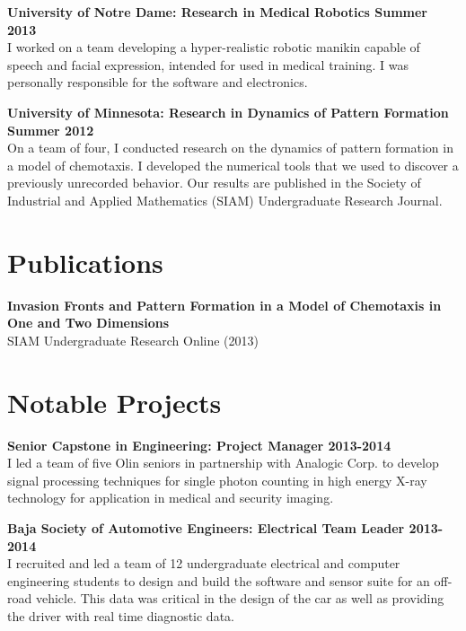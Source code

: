 \documentclass{article}
\newcommand{\newitem}[2]{\noindent\textbf{#1 \hfill #2}\\}
\newcommand{\gimmespace}{\vspace{1em}}
\begin{document}
\newitem{University of Notre Dame: Research in Medical Robotics}{Summer 2013}
I worked on a team developing a hyper-realistic robotic manikin capable of speech and facial expression, intended for used in medical training. I was personally responsible for the software and electronics.
\gimmespace

\newitem{University of Minnesota: Research in Dynamics of Pattern Formation}{Summer 2012}
On a team of four, I conducted research on the dynamics of pattern formation in a model of chemotaxis. I developed the numerical tools that we used to discover a previously unrecorded behavior. Our results are published in the Society of Industrial and Applied Mathematics (SIAM) Undergraduate Research Journal.

\section*{Publications}
\newitem{Invasion Fronts and Pattern Formation in a Model of Chemotaxis in One and Two Dimensions}{}
SIAM Undergraduate Research Online (2013)

\section*{Notable Projects}
\newitem{Senior Capstone in Engineering: Project Manager}{2013-2014}
I led a team of five Olin seniors in partnership with Analogic Corp. to develop signal processing techniques for single photon counting in high energy X-ray technology for application in medical and security imaging.
\gimmespace

\newitem{Baja Society of Automotive Engineers: Electrical Team Leader}{2013-2014}
I recruited and led a team of 12 undergraduate electrical and computer engineering students to design and build the software and sensor suite for an off-road vehicle. This data was critical in the design of the car as well as providing the driver with real time diagnostic data.
\end{document}
